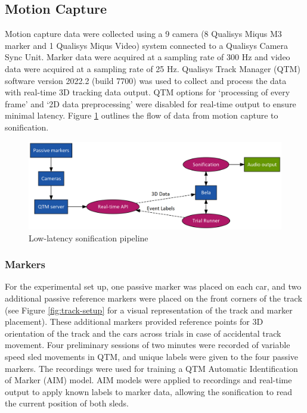 \documentclass[10pt,a4paper,onecolumn]{article}
\begin{document}
\hypertarget{motion-capture}{%
\subsection{Motion Capture}\label{motion-capture}}

Motion capture data were collected using a 9 camera (8 Qualisys Miqus M3 marker and 1 Qualisys Miqus Video) system connected to a Qualisys Camera Sync Unit. Marker data were acquired at a sampling rate of 300 Hz and video data were acquired at a sampling rate of 25 Hz. Qualisys Track Manager (QTM) software version 2022.2 (build 7700) was used to collect and process the data with real-time 3D tracking data output. QTM options for `processing of every frame' and `2D data preprocessing' were disabled for real-time output to ensure minimal latency. Figure \ref{fig:exp-graph} outlines the flow of data from motion capture to sonification.

\begin{figure}[h]

{\centering \includegraphics[width=1\linewidth]{figures/exp-graph} 

}

\caption{Low-latency sonification pipeline}\label{fig:exp-graph}
\end{figure}

\hypertarget{markers}{%
\subsubsection{Markers}\label{markers}}

For the experimental set up, one passive marker was placed on each car, and two additional passive reference markers were placed on the front corners of the track (see Figure \ref{fig:track-setup} for a visual representation of the track and marker placement). These additional markers provided reference points for 3D orientation of the track and the cars across trials in case of accidental track movement. Four preliminary sessions of two minutes were recorded of variable speed sled movements in QTM, and unique labels were given to the four passive markers. The recordings were used for training a QTM Automatic Identification of Marker (AIM) model. AIM models were applied to recordings and real-time output to apply known labels to marker data, allowing the sonification to read the current position of both sleds.
\end{document}
